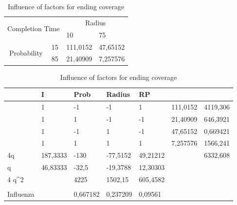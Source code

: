 \begin{table}[H]
\centering
\begin{tabular}{|cl|rr|}
\hline
\multicolumn{2}{|c|}{\multirow{2}{*}{Completion Time}}  & \multicolumn{2}{c|}{Radius}                             \\ \cline{3-4} 
\multicolumn{2}{|c|}{}                                  & \multicolumn{1}{l|}{10}       & \multicolumn{1}{l|}{75} \\ \hline
\multicolumn{1}{|c|}{\multirow{2}{*}{Probability}} & 15 & \multicolumn{1}{r|}{111,0152} & 47,65152                \\ \cline{2-4} 
\multicolumn{1}{|c|}{}                             & 85 & \multicolumn{1}{r|}{21,40909} & 7,257576                \\ \hline
\end{tabular}
\caption{Influence of factors for ending coverage}
\label{tab:extreme-factors-on-completion-time}
\end{table}

\begin{table}[H]
\centering
\begin{tabular}{|l|l|l|l|l|l|l|}
\hline
                       & I        & Prob     & Radius   & RP       &          &          \\ \hline
                       & 1        & -1       & -1       & 1        & 111,0152 & 4119,306 \\ \hline
                       & 1        & 1        & -1       & -1       & 21,40909 & 646,3921 \\ \hline
                       & 1        & -1       & 1        & -1       & 47,65152 & 0,669421 \\ \hline
                       & 1        & 1        & 1        & 1        & 7,257576 & 1566,241 \\ \hline
4q                     & 187,3333 & -130     & -77,5152 & 49,21212 &          & 6332,608 \\ \hline
q                      & 46,83333 & -32,5    & -19,3788 & 12,30303 &          &          \\ \hline
4 q\textasciicircum{}2 &          & 4225     & 1502,15  & 605,4582 &          &          \\ \hline
                       &          &          &          &          &          &          \\ \hline
Influenza              &          & 0,667182 & 0,237209 & 0,09561  &          &          \\ \hline
\end{tabular}
\caption{Influence of factors for ending coverage}
\label{tab:influence-on-completion-time}
\end{table}

